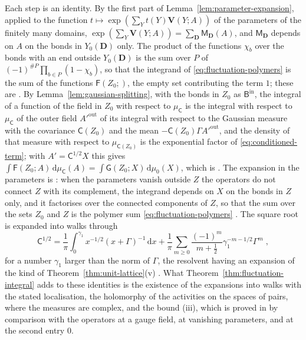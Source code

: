 \documentclass[11pt]{preprint}
\makeatletter
\newcommand{\dd}{\mathrm{d}}
\newcommand*{\bigcdot}{}%
\DeclareRobustCommand*{\bigcdot}{%
	\mathbin{\mathpalette\bigcdot@{}}%
}
\newcommand*{\bigcdot@scalefactor}{.7}
\newcommand*{\bigcdot@widthfactor}{1.15}
\newcommand*{\bigcdot@}[2]{%
	\sbox0{$#1\vcenter{}$}%
	\sbox2{$#1\cdot\m@th$}%
	\hbox to \bigcdot@widthfactor\wd2{%
		\hss
		\raise\ht0\hbox{%
			\scalebox{\bigcdot@scalefactor}{%
				\lower\ht0\hbox{$#1\bullet\m@th$}%
			}%
		}%
		\hss
	}%
}
\numberwithin{equation}{section}
\makeatother
\begin{document}
Each step is an identity. By the first part of Lemma~\ref{lem:parameter-expansion}, applied to the function $t \mapsto \exp(\sum_Yt(Y)\mathbf V(Y; A))$ of the parameters of the finitely many domains, $\exp(\sum_Y\mathbf V(Y; A)) = \sum_{\mathbf D}\mathsf M_{\mathbf D}(A)$, and $\mathsf M_{\mathbf D}$ depends on $A$ on the bonds in $Y_0(\mathbf D)$ only. The product of the functions $\chi_b$ over the bonds with an end outside $Y_0(\mathbf D)$ is the sum over $P$ of $(-1)^{\#P}\prod_{b \in P}(1 - \chi_b)$, so that the integrand of \eqref{eq:fluctuation-polymers} is the sum of the functions $\mathsf F(Z_0; \bigcdot)$, the empty set contributing the term $1$; these are \cite[(2.1)--(2.4)]{BalabanRG2}. By Lemma~\ref{lem:gaussian-splitting}, with the bonds in $Z_0$ as $\mathsf B^{\mathrm{in}}$, the integral of a function of the field in $Z_0$ with respect to $\mu_{\mathsf C}$ is the integral with respect to $\mu_{\mathsf C}$ of the outer field $A'^{\mathrm{out}}$ of its integral with respect to the Gaussian measure with the covariance $\mathsf C(Z_0)$ and the mean $-\mathsf C(Z_0)\Gamma A'^{\mathrm{out}}$, and the density of that measure with respect to $\mu_{\mathsf C(Z_0)}$ is the exponential factor of \eqref{eq:conditioned-term}; with $A' = \mathsf C^{1/2}X$ this gives $\int\mathsf F(Z_0; A)\,\dd\mu_{\mathsf C}(A) = \int\mathsf G(Z_0; X)\,\dd\mu_0(X)$, which is \cite[(2.5), (2.6)]{BalabanRG2}. The expansion in the parameters is \cite[(2.8)]{BalabanRG2}: when the parameters vanish outside $Z$ the operators do not connect $Z$ with its complement, the integrand depends on $X$ on the bonds in $Z$ only, and it factorises over the connected components of $Z$, so that the sum over the sets $Z_0$ and $Z$ is the polymer sum \eqref{eq:fluctuation-polymers} \cite[(2.9)--(2.11)]{BalabanRG2}. The square root is expanded into walks through
\begin{equation}\label{eq:square-root}
    \mathsf C^{1/2} = \frac{1}{\pi}\int_0^{\gamma_1}x^{-1/2}(x + \Gamma)^{-1}\,\dd x + \frac{1}{\pi}\sum_{m \geqslant 0}\frac{(-1)^m}{m + \frac{1}{2}}\gamma_1^{-m-1/2}\Gamma^m\;,
\end{equation}
for a number $\gamma_1$ larger than the norm of $\Gamma$, the resolvent having an expansion of the kind of Theorem~\ref{thm:unit-lattice}(v) \cite[(2.7)]{BalabanRG2}. What Theorem~\ref{thm:fluctuation-integral} adds to these identities is the existence of the expansions into walks with the stated localisation, the holomorphy of the activities on the spaces of pairs, where the measures are complex, and the bound (iii), which is proved in \cite[(2.14)--(2.38)]{BalabanRG2} by comparison with the operators at a gauge field, at vanishing parameters, and at the second entry $0$.
\end{document}
